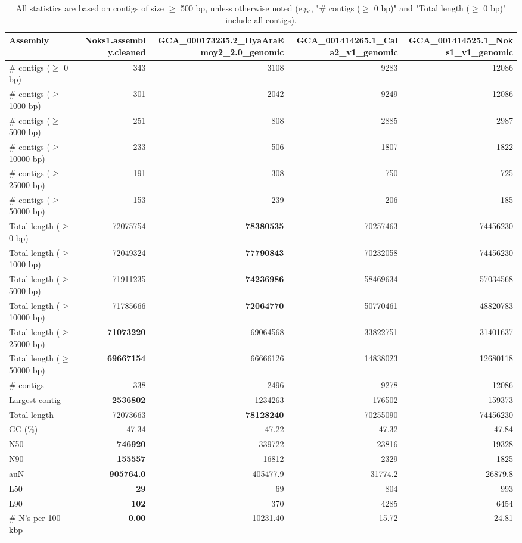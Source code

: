 \documentclass[12pt,a4paper]{article}
\begin{document}
\begin{table}[ht]
\begin{center}
\caption{All statistics are based on contigs of size $\geq$ 500 bp, unless otherwise noted (e.g., "\# contigs ($\geq$ 0 bp)" and "Total length ($\geq$ 0 bp)" include all contigs).}
\begin{tabular}{|l*{4}{|r}|}
\hline
Assembly & Noks1.assembly.cleaned & GCA\_000173235.2\_HyaAraEmoy2\_2.0\_genomic & GCA\_001414265.1\_Cala2\_v1\_genomic & GCA\_001414525.1\_Noks1\_v1\_genomic \\ \hline
\# contigs ($\geq$ 0 bp) & 343 & 3108 & 9283 & 12086 \\ \hline
\# contigs ($\geq$ 1000 bp) & 301 & 2042 & 9249 & 12086 \\ \hline
\# contigs ($\geq$ 5000 bp) & 251 & 808 & 2885 & 2987 \\ \hline
\# contigs ($\geq$ 10000 bp) & 233 & 506 & 1807 & 1822 \\ \hline
\# contigs ($\geq$ 25000 bp) & 191 & 308 & 750 & 725 \\ \hline
\# contigs ($\geq$ 50000 bp) & 153 & 239 & 206 & 185 \\ \hline
Total length ($\geq$ 0 bp) & 72075754 & {\bf 78380535} & 70257463 & 74456230 \\ \hline
Total length ($\geq$ 1000 bp) & 72049324 & {\bf 77790843} & 70232058 & 74456230 \\ \hline
Total length ($\geq$ 5000 bp) & 71911235 & {\bf 74236986} & 58469634 & 57034568 \\ \hline
Total length ($\geq$ 10000 bp) & 71785666 & {\bf 72064770} & 50770461 & 48820783 \\ \hline
Total length ($\geq$ 25000 bp) & {\bf 71073220} & 69064568 & 33822751 & 31401637 \\ \hline
Total length ($\geq$ 50000 bp) & {\bf 69667154} & 66666126 & 14838023 & 12680118 \\ \hline
\# contigs & 338 & 2496 & 9278 & 12086 \\ \hline
Largest contig & {\bf 2536802} & 1234263 & 176502 & 159373 \\ \hline
Total length & 72073663 & {\bf 78128240} & 70255090 & 74456230 \\ \hline
GC (\%) & 47.34 & 47.22 & 47.32 & 47.84 \\ \hline
N50 & {\bf 746920} & 339722 & 23816 & 19328 \\ \hline
N90 & {\bf 155557} & 16812 & 2329 & 1825 \\ \hline
auN & {\bf 905764.0} & 405477.9 & 31774.2 & 26879.8 \\ \hline
L50 & {\bf 29} & 69 & 804 & 993 \\ \hline
L90 & {\bf 102} & 370 & 4285 & 6454 \\ \hline
\# N's per 100 kbp & {\bf 0.00} & 10231.40 & 15.72 & 24.81 \\ \hline
\end{tabular}
\end{center}
\end{table}
\end{document}
